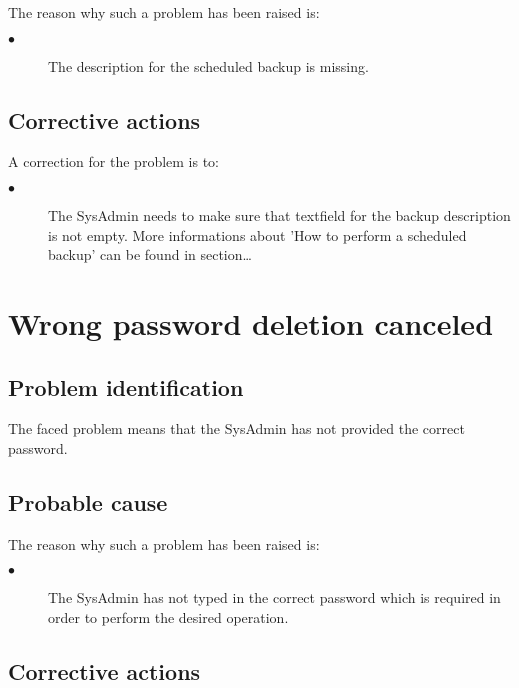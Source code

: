 The reason why such a problem has been raised is:\\
\begin{description}
\item[$\bullet$] The description for the scheduled backup is missing.
\end{description}


\subsection{Corrective actions}

A correction for the problem is to:\\
\begin{description}
\item[$\bullet$] The SysAdmin needs to make sure that textfield for the backup
description is not empty. More informations about 'How to perform a scheduled
backup' can be found in section\ldots

\end{description}










\section{Wrong password deletion canceled} 

\subsection{Problem identification}
The faced problem means that the SysAdmin has not provided the correct password.

\subsection{Probable cause}

The reason why such a problem has been raised is:\\
\begin{description}
\item[$\bullet$] The SysAdmin has not typed in the correct password which is
required in order to perform the desired operation.
\end{description}


\subsection{Corrective actions}

